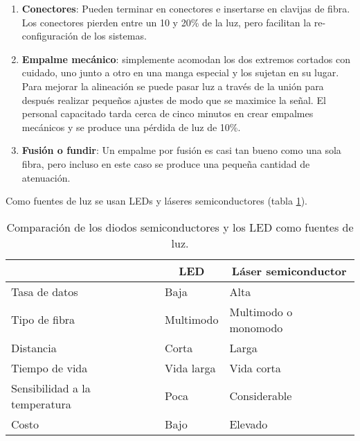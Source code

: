 \documentclass[
	12pt, %
	fleqn, %
	a4paper, %
	oneside, %
]{LegrandOrangeBook}
\begin{document}
\begin{enumerate}
\item \textbf{Conectores}: Pueden terminar en conectores e insertarse en clavijas de fibra. Los conectores pierden entre un 10 y 20\% de la luz, pero facilitan la re-configuración de los sistemas.
\item \textbf{Empalme mecánico}: simplemente acomodan
los dos extremos cortados con cuidado, uno junto a otro en una manga especial y los sujetan en su lugar. Para mejorar la alineación se puede pasar luz a través de la unión para después realizar pequeños ajustes de modo que se maximice la señal. El personal capacitado tarda cerca de cinco minutos en crear empalmes mecánicos y se produce una pérdida de luz de 10\%.
\item \textbf{Fusión o fundir}: Un empalme por fusión es casi tan bueno como una sola fibra, pero incluso en este caso se produce una pequeña cantidad de atenuación.
\end{enumerate}
Como fuentes de luz se usan LEDs y láseres semiconductores (tabla \ref{tab:led vs laser}).
\begin{table}[]
\centering
\begin{tabular}{|l|l|l|}
\hline
\rowcolor[HTML]{CBCEFB} 
\multicolumn{1}{|c|}{\cellcolor[HTML]{CBCEFB}Característica} & \multicolumn{1}{c|}{\cellcolor[HTML]{CBCEFB}LED} & \multicolumn{1}{c|}{\cellcolor[HTML]{CBCEFB}Láser semiconductor} \\ \hline
Tasa de datos                                                & Baja                                             & Alta                                                             \\ \hline
Tipo de fibra                                                & Multimodo                                        & Multimodo o monomodo                                             \\ \hline
Distancia                                                    & Corta                                            & Larga                                                            \\ \hline
Tiempo de vida                                               & Vida larga                                       & Vida corta                                                       \\ \hline
Sensibilidad a la temperatura                                & Poca                                             & Considerable                                                     \\ \hline
Costo                                                        & Bajo                                             & Elevado                                                          \\ \hline
\end{tabular}
\caption{Comparación de los diodos semiconductores y los LED como fuentes de luz.}
\label{tab:led vs laser}
\end{table}
\end{document}
